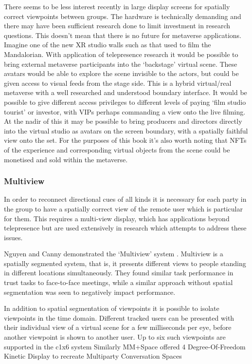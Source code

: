 There seems to be less interest recently in large display screens for spatially correct viewpoints between groups. The hardware is technically demanding and there may have been sufficient research done to limit investment in research questions. This doesn't mean that there is no future for metaverse applications. Imagine one of the new XR studio walls such as that used to film the Mandalorian. With application of telepresence research it would be possible to bring external metaverse participants into the `backstage' virtual scene. These avatars would be able to explore the scene invisible to the actors, but could be given access to visual feeds from the stage side. This is a hybrid virtual/real metaverse with a well researched and understood boundary interface. It would be possible to give different access privileges to different levels of paying `film studio tourist' or investor, with VIPs perhaps commanding a view onto the live filming. At the nadir of this it may be possible to bring producers and directors directly into the virtual studio as avatars on the screen boundary, with a spatially faithful view onto the set. For the purposes of this book it's also worth noting that NFTs of the experience and corresponding virtual objects from the scene could be monetised and sold within the metaverse.\subsubsection{Multiview}
In order to reconnect directional cues of all kinds it is necessary for each party in the group to have a spatially correct view of the remote user which is particular for them. This requires a multi-view display, which has applications beyond telepresence but are used extensively in research which attempts to address these issues.\par
Nguyen and Canny demonstrated the `Multiview' system \cite{Nguyen2005}. Multiview is a spatially segmented system, that is, it presents different views to people standing in different locations simultaneously. They found similar task performance in trust tasks to face-to-face meetings, while a similar approach without spatial segmentation was seen to negatively impact performance.\par
                    
In addition to spatial segmentation of viewpoints \cite{Gotsch2018} it is possible to isolate viewpoints in the time domain. Different tracked users can be presented with their individual view of a virtual scene for a few milliseconds per eye, before another viewpoint is shown to another user. Up to six such viewpoints are supported in the c1x6 system \cite{Kulik2011}
Similarly MM+Space offered 4 Degree-Of-Freedom Kinetic Display to recreate Multiparty Conversation Spaces \cite{Otsuka2013}
